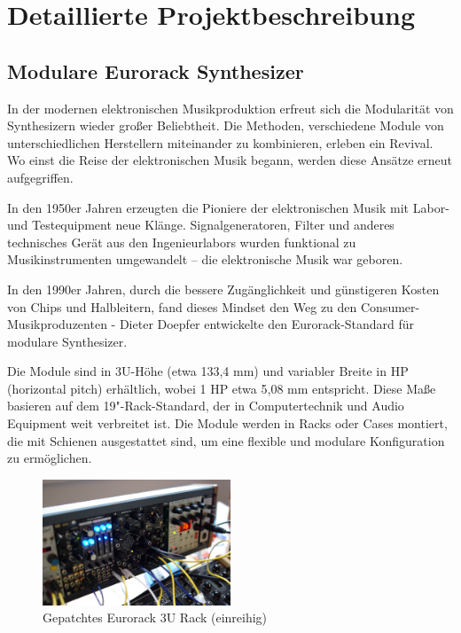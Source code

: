 \newpage
\section{Detaillierte Projektbeschreibung}

	\subsection{Modulare Eurorack Synthesizer}
	
	In der modernen elektronischen Musikproduktion erfreut sich die Modularität von Synthesizern wieder großer Beliebtheit. 
	Die Methoden, verschiedene Module von unterschiedlichen Herstellern miteinander zu kombinieren, erleben ein Revival. \cite{ferguson2015interview}
	Wo einst die Reise der elektronischen Musik begann, werden diese Ansätze erneut aufgegriffen.
	
	In den 1950er Jahren erzeugten die Pioniere der elektronischen Musik mit Labor- und Testequipment neue Klänge. 
	Signalgeneratoren, Filter und anderes technisches Gerät aus den Ingenieurlabors wurden funktional zu Musikinstrumenten umgewandelt – die elektronische Musik war geboren. \cite{holmes2002electronic}
	
	In den 1990er Jahren, durch die bessere Zugänglichkeit und günstigeren Kosten von Chips und Halbleitern, fand dieses Mindset den Weg zu den Consumer-Musikproduzenten - Dieter Doepfer entwickelte den Eurorack-Standard für modulare Synthesizer. \cite{eurorack-standard}
	
	Die Module sind in 3U-Höhe (etwa 133,4 mm) und variabler Breite in HP (horizontal pitch) erhältlich, wobei 1 HP etwa 5,08 mm entspricht. Diese Maße basieren auf dem 19"-Rack-Standard, der in Computertechnik und Audio Equipment weit verbreitet ist. Die Module werden in Racks oder Cases montiert, die mit Schienen ausgestattet sind, um eine flexible und modulare Konfiguration zu ermöglichen. \cite{iec60297-3-108:2014}
	
	
	\begin{figure}[h!]
		\centering
		\includegraphics[width=0.5\textwidth]{images/02_detaillierte-projektbeschr/eurorack-patched}
		\caption{Gepatchtes Eurorack 3U Rack (einreihig)}
		\label{fig:eurorack-patched}
	\end{figure}
	
